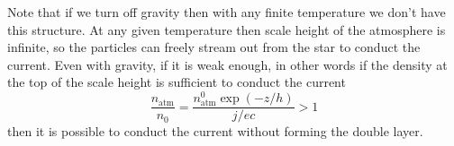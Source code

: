 \documentclass[letterpaper, 11pt]{article}
\numberwithin{equation}{section}
\numberwithin{figure}{section}
\begin{document}
Note that if we turn off gravity then with any finite temperature we don't have this structure. At any given temperature then scale height of the atmosphere is infinite, so the particles can freely stream out from the star to conduct the current. Even with gravity, if it is weak enough, in other words if the density at the top of the scale height is sufficient to conduct the current
\begin{equation}
    \label{eq:41}
    \frac{n_\mathrm{atm}}{n_0} = \frac{n_\mathrm{atm}^0\exp(-z/h)}{j/ec} > 1
\end{equation}
then it is possible to conduct the current without forming the double layer.
\end{document}
